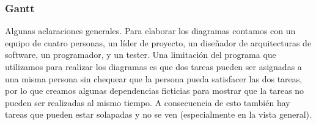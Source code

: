 
\subsubsection{Gantt}

Algunas aclaraciones generales. Para elaborar los diagramas contamos con un equipo de cuatro personas, un l\'ider de proyecto, un diseñador de arquitecturas de software, un programador, y un tester. Una limitaci\'on del programa que utilizamos para realizar los diagramas es que dos tareas pueden ser asignadas a una misma persona sin chequear que la persona pueda satisfacer las dos tareas, por lo que creamos algunas dependencias ficticias para mostrar que la tareas no pueden ser realizadas al mismo tiempo. A consecuencia de esto tambi\'en hay tareas que pueden estar solapadas y no se ven (especialmente en la vista general).

